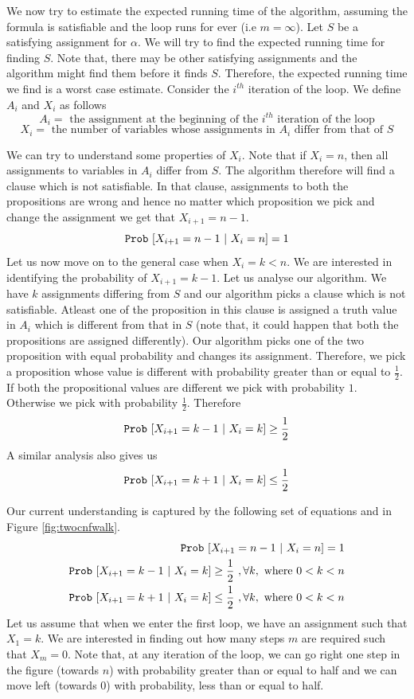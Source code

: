 We now try to estimate the expected running time of the algorithm, assuming the formula is satisfiable and the loop runs for ever (i.e $m= \infty$). Let $S$ be a satisfying assignment for $\alpha$. We will try to find the expected running time for finding $S$. Note that, there may be other satisfying assignments and the algorithm might find them before it finds $S$. Therefore, the expected running time we find is a worst case estimate. Consider the $i^{th}$ iteration of the loop. We define $A_i$ and $X_i$ as follows
\[
A_i = \text{ the assignment at the beginning of the }i^{th} \text{ iteration of the loop} 
\]
\[
X_i = \text{ the number of variables whose assignments in } A_i \text{ differ from that of }S
\]

We can try to understand some properties of $X_i$. Note that if $X_i = n$, then all assignments to variables in $A_i$ differ from $S$. The algorithm therefore will find a clause which is not satisfiable. In that clause, assignments to both the propositions are wrong and hence no matter which proposition we pick and change the assignment we get that $X_{i+1}=n-1$.
\[
\mathtt{Prob}~[X_{i+1} = n-1 ~|~ X_i = n] = 1
\]
Let us now move on to the general case when $X_i = k<n$. We are interested in identifying the probability of $X_{i+1} = k-1$. Let us analyse our algorithm. We have $k$ assignments differing from $S$ and our algorithm picks a clause which is not satisfiable. Atleast one of the proposition in this clause is assigned a truth value in $A_i$ which is different from that in $S$ (note that, it could happen that both the propositions are assigned differently). Our algorithm picks one of the two proposition with equal probability and changes its assignment. Therefore, we pick a proposition whose value is different with probability greater than or equal to $\frac{1}{2}$. If both the propositional values are different we pick with probability $1$. Otherwise we pick with probability $\frac{1}{2}$. Therefore
\[
\mathtt{Prob}~[X_{i+1} = k-1 ~|~ X_i = k] \geq \frac{1}{2}
\]
A similar analysis also gives us
\[
\mathtt{Prob}~[X_{i+1} = k+1 ~|~ X_i = k] \leq \frac{1}{2}
\]

Our current understanding is captured by the following set of equations and in Figure \ref{fig:twocnfwalk}.
\begin{equation}
\label{eq:twoexactcnf}
\begin{split}
\mathtt{Prob}~[X_{i+1} = n-1 ~|~ X_i = n] = 1 \\
\mathtt{Prob}~[X_{i+1} = k-1 ~|~ X_i = k] \geq \frac{1}{2} ~, \forall k, \text{ where } 0< k < n\\
\mathtt{Prob}~[X_{i+1} = k+1 ~|~ X_i = k] \leq \frac{1}{2}~, \forall k, \text{ where } 0< k < n
\end{split}
\end{equation}
Let us assume that when we enter the first loop, we have an assignment such that $X_1 = k$. We are interested in finding out how many steps $m$ are required such that $X_m = 0$. Note that, at any iteration of the loop, we can go right one step in the figure (towards $n$) with probability greater than or equal to half and we can move left (towards $0$) with probability, less than or equal to half.


